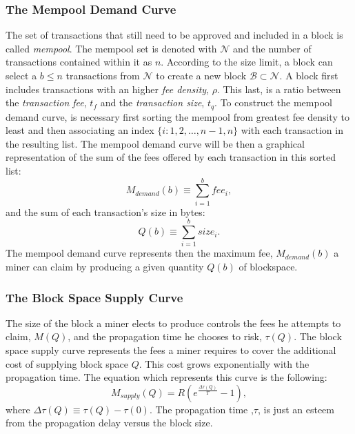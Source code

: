 \documentclass[USenglish]{uit-thesis}
\begin{document}
\subsubsection{The Mempool Demand Curve}
\label{sec:mempooldemand}
The set of transactions that still need to be approved and included
in a block is called \emph{mempool}.
The mempool set is denoted with $\mathcal{N}$ and the number
of transactions contained within it as $n$.
According to the size limit, a block can select a $b \leq n$
transactions from $\mathcal{N}$ to create a
new block $\mathcal{B} \subset \mathcal{N}$.
A block first includes transactions with an higher \emph{fee density}, $\rho$.
This last, is a ratio between
the \emph{transaction fee}, $t_f$ and the \emph{transaction size}, $t_q$.
To construct the mempool demand
curve, is necessary first sorting the mempool from
greatest fee density to least and then
associating an index $\{i: 1,2,\dots,n-1,n\}$ with each
transaction in the resulting list.
The mempool demand curve will be then a graphical
representation of the sum of the fees offered
by each transaction in this sorted list:
\begin{equation}
\label{eq:memdemandcurve}
M_{demand}(b) \equiv \sum_{i=1}^{b} fee_i,
\end{equation}
and the sum of each transaction's size in bytes:
\begin{equation}
\label{eq:transactionsize}
Q(b) \equiv \sum_{i = 1}^{b} size_i.
\end{equation}
The mempool demand curve represents then the maximum fee,
$M_{demand}(b)$
a miner can claim by producing a given quantity $Q(b)$ of blockspace.

\subsubsection{The Block Space Supply Curve}
\label{sec:blockspacesupply}
The size of the block a miner elects to produce controls the fees he attempts to claim, $M(Q)$,
and the propagation time he chooses to risk, $\tau(Q)$. The block space supply curve represents
the fees a miner requires to cover the additional cost of
supplying block space $Q$. This cost grows
exponentially with the propagation time. The equation which
represents this curve is the following:
\begin{equation}
\label{eq:blockspacesupply}
M_{supply}(Q) = R\left(e^{\frac{\Delta \tau (Q)}{T}} - 1\right),
\end{equation}
where $\Delta \tau (Q) \equiv \tau(Q) - \tau(0)$.
The propagation time ,$\tau$, is just an esteem from
the propagation delay versus the block size.
\end{document}
